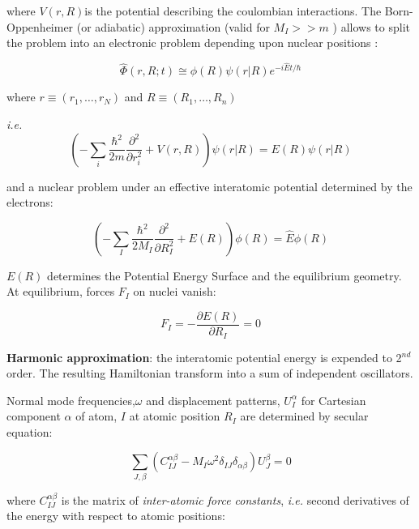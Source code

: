  where $V(r,R)$is the potential describing the coulombian interactions. The Born-Oppenheimer (or adiabatic) approximation (valid for $M_{I} >> m$ ) allows to split the problem into an electronic problem depending upon nuclear positions :
 
 \begin{equation}
 \hat{\Phi} (r,R;t) \cong \phi (R) \psi (r|R)e^{-i\hat{E}t/\hbar}
 \end{equation}
 
 where $ r \equiv (r_{1}, \ldots, r_{N})$ and $R \equiv (R_{1}, \ldots, R_{n})$
 
 
 \textit{i.e.}
 \begin{equation}
 \left( - \sum_{i} \frac{\hbar^{2}}{2m} \frac{\partial^{2}}{\partial r_{i}^{2}} + V (r,R)\right) \psi (r|R) = E(R) \psi (r|R)
 \end{equation}
 
 
 and a nuclear problem under an effective interatomic potential determined by the electrons:
 
 \begin{equation}
 \left( - \sum_{I} \frac{\hbar^{2}}{2M_{I}} \frac{\partial^{2}}{\partial R_{I}^{2}} + E(R)\right) \phi(R) = \hat{E} \phi(R)
 \end{equation}
 
 $ E(R)$ determines the Potential Energy Surface and the equilibrium geometry. At equilibrium, forces $ F_{I}$ on nuclei vanish:
 
 \begin{equation}
 F_{I} = -\frac{\partial E(R)}{\partial R_{I}} = 0
 \end{equation}
 
 \textbf{Harmonic approximation}: the interatomic potential energy is expended to 2$^{nd}$ order. The resulting Hamiltonian transform into a sum of independent oscillators.
 
 Normal mode frequencies,$\omega$ and displacement patterns, $U_{I}^{\alpha}$ for Cartesian component $\alpha$ of atom, $I$ at atomic position $R_{I}$ are determined by secular equation:
 
 \begin{equation}
 \sum_{J, \beta} \left( C_{IJ}^{\alpha\beta} - M _{I} \omega^{2} \delta_{IJ} \delta_{\alpha\beta}\right) U_{J}^{\beta} = 0
 \end{equation}
 
 where $ C_{IJ}^{\alpha\beta}$ is the matrix of \textit{inter-atomic force constants}, \textit{i.e.} second derivatives of the energy with respect to atomic positions:
 
